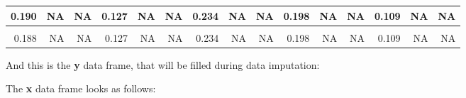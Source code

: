\documentclass[]{article}
\begin{document}
\begin{table}[H]
\begin{tabular}[t]{r|r|r|r|r|r|r|r|r|r|r|r|r|r|r}
\hline
0.190 & NA & NA & 0.127 & NA & NA & 0.234 & NA & NA & 0.198 & NA & NA & 0.109 & NA & NA\\
\hline
\cellcolor{gray!6}{0.189} & \cellcolor{gray!6}{NA} & \cellcolor{gray!6}{NA} & \cellcolor{gray!6}{0.127} & \cellcolor{gray!6}{NA} & \cellcolor{gray!6}{NA} & \cellcolor{gray!6}{0.234} & \cellcolor{gray!6}{NA} & \cellcolor{gray!6}{NA} & \cellcolor{gray!6}{0.198} & \cellcolor{gray!6}{NA} & \cellcolor{gray!6}{NA} & \cellcolor{gray!6}{0.109} & \cellcolor{gray!6}{NA} & \cellcolor{gray!6}{NA}\\
\hline
0.188 & NA & NA & 0.127 & NA & NA & 0.234 & NA & NA & 0.198 & NA & NA & 0.109 & NA & NA\\
\hline
\end{tabular}
\end{table}

And this is the \textbf{y} data frame, that will be filled during data
imputation:

The \textbf{x} data frame looks as follows:
\end{document}
